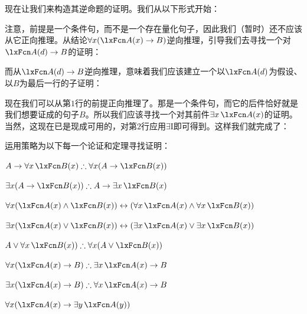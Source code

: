 现在让我们来构造其逆命题的证明。我们从以下形式开始：


\begin{fitchproof}
	\PR
	\ellipsesline
\end{fitchproof}


注意，前提是一个条件句，而不是一个存在量化句子，因此我们（暂时）还不应该从它正向推理。从结论$\forall x(\atom{A}{x} \eif B)$逆向推理，引导我们去寻找一个对$\atom{A}{d} \eif B$的证明：


\begin{fitchproof}
	\PR
	\ellipsesline
\end{fitchproof}


而从$\atom{A}{d} \eif B$逆向推理，意味着我们应该建立一个以$\atom{A}{d}$为假设、以$B$为最后一行的子证明：


\begin{fitchproof}
	\PR
	\open
	\AS
	\ellipsesline
	\close
\end{fitchproof}


现在我们可以从第$1$行的前提正向推理了。那是一个条件句，而它的后件恰好就是我们想要证成的句子$B$。所以我们应该寻找一个对其前件$\exists x\,\atom{A}{x}$的证明。当然，这现在已是现成可用的，对第$2$行应用$\exists$I即可得到。这样我们就完成了：


\begin{fitchproof}
	\PR
	\open
	\AS
	\close
\end{fitchproof}

\practiceproblems

\problempart
运用策略为以下每一个论证和定理寻找证明：


\begin{compactlist}
\item $A \eif \forall x\,\atom{B}{x} \therefore \forall x(A \eif \atom{B}{x})$
\item $\exists x(A \eif \atom{B}{x}) \therefore A \eif \exists x\, \atom{B}{x}$
\item $\forall x(\atom{A}{x} \eand \atom{B}{x}) \eiff (\forall x\,\atom{A}{x} \eand \forall x\,\atom{B}{x})$
\item $\exists x(\atom{A}{x} \eor \atom{B}{x}) \eiff (\exists x\,\atom{A}{x} \eor \exists x\,\atom{B}{x})$
\item $A \eor \forall x\,\atom{B}{x}) \therefore \forall x(A \eor \atom{B}{x})$
\item $\forall x(\atom{A}{x} \eif B) \therefore \exists x\,\atom{A}{x} \eif B$
\item $\exists x(\atom{A}{x} \eif B) \therefore \forall x\,\atom{A}{x} \eif B$
\item $\forall x(\atom{A}{x} \eif \exists y\,\atom{A}{y})$
\end{compactlist}


